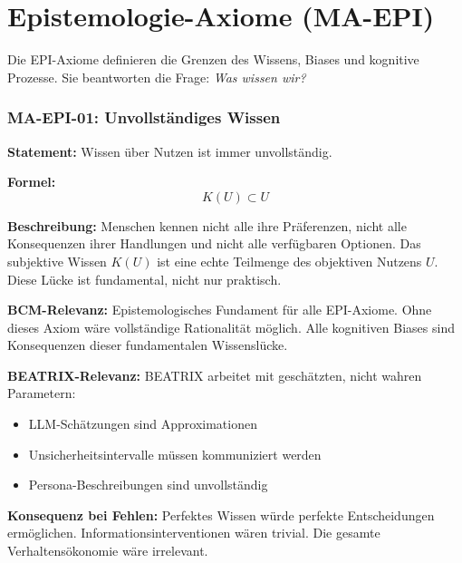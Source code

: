 
\section{Epistemologie-Axiome (MA-EPI)}

Die EPI-Axiome definieren die Grenzen des Wissens, Biases und kognitive Prozesse.
Sie beantworten die Frage: \textit{Was wissen wir?}


\subsubsection*{MA-EPI-01: Unvollständiges Wissen}

\textbf{Statement:} Wissen über Nutzen ist immer unvollständig.

\textbf{Formel:}
\begin{equation}
K(U) \subset U
\end{equation}

\textbf{Beschreibung:}
Menschen kennen nicht alle ihre Präferenzen, nicht alle Konsequenzen ihrer Handlungen und nicht alle verfügbaren Optionen. Das subjektive Wissen $K(U)$ ist eine echte Teilmenge des objektiven Nutzens $U$. Diese Lücke ist fundamental, nicht nur praktisch.

\textbf{BCM-Relevanz:}
Epistemologisches Fundament für alle EPI-Axiome. Ohne dieses Axiom wäre vollständige Rationalität möglich. Alle kognitiven Biases sind Konsequenzen dieser fundamentalen Wissenslücke.

\textbf{BEATRIX-Relevanz:}
BEATRIX arbeitet mit geschätzten, nicht wahren Parametern:
\begin{itemize}
    \item LLM-Schätzungen sind Approximationen
    \item Unsicherheitsintervalle müssen kommuniziert werden
    \item Persona-Beschreibungen sind unvollständig
\end{itemize}

\textbf{Konsequenz bei Fehlen:}
Perfektes Wissen würde perfekte Entscheidungen ermöglichen. Informationsinterventionen wären trivial. Die gesamte Verhaltensökonomie wäre irrelevant.


